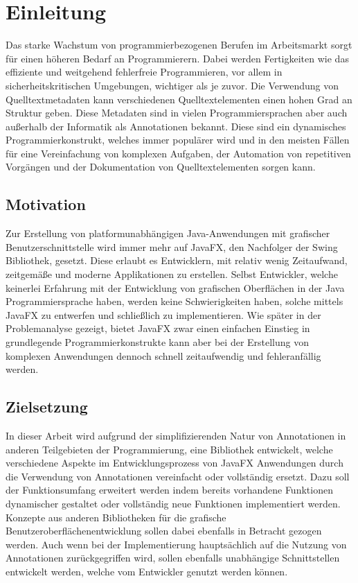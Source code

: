 \chapter{Einleitung}
\label{einleitung}
Das starke Wachstum von programmierbezogenen Berufen im Arbeitsmarkt sorgt für einen höheren Bedarf an Programmierern. Dabei werden Fertigkeiten wie das effiziente und weitgehend fehlerfreie Programmieren, vor allem in sicherheitskritischen Umgebungen, wichtiger als je zuvor. Die Verwendung von Quelltextmetadaten kann verschiedenen Quelltextelementen einen hohen Grad an Struktur geben. Diese Metadaten sind in vielen Programmiersprachen aber auch außerhalb der Informatik als Annotationen bekannt. Diese sind ein dynamisches Programmierkonstrukt, welches immer populärer wird und in den meisten Fällen für eine Vereinfachung von komplexen Aufgaben, der Automation von repetitiven Vorgängen und der Dokumentation von Quelltextelementen sorgen kann.
\section{Motivation}
\label{motivation}
Zur Erstellung von platformunabhängigen Java-Anwendungen mit grafischer Benutzerschnittstelle wird immer mehr auf JavaFX, den Nachfolger der Swing Bibliothek, gesetzt. Diese erlaubt es Entwicklern, mit relativ wenig Zeitaufwand, zeitgemäße und moderne Applikationen zu erstellen. Selbst Entwickler, welche keinerlei Erfahrung mit der Entwicklung von grafischen Oberflächen in der Java Programmiersprache haben, werden keine Schwierigkeiten haben, solche mittels JavaFX zu entwerfen und schließlich zu implementieren. Wie später in der Problemanalyse gezeigt, bietet JavaFX zwar einen einfachen Einstieg in grundlegende Programmierkonstrukte kann aber bei der Erstellung von komplexen Anwendungen dennoch schnell zeitaufwendig und fehleranfällig werden.
\section{Zielsetzung}
\label{zielsetzung}
In dieser Arbeit wird aufgrund der simplifizierenden Natur von Annotationen in anderen Teilgebieten der Programmierung, eine Bibliothek entwickelt, welche verschiedene Aspekte im Entwicklungsprozess von JavaFX Anwendungen durch die Verwendung von Annotationen vereinfacht oder vollständig ersetzt. Dazu soll der Funktionsumfang erweitert werden indem bereits vorhandene Funktionen dynamischer gestaltet oder vollständig neue Funktionen implementiert werden. Konzepte aus anderen Bibliotheken für die grafische Benutzeroberflächenentwicklung sollen dabei ebenfalls in Betracht gezogen werden. Auch wenn bei der Implementierung hauptsächlich auf die Nutzung von Annotationen zurückgegriffen wird, sollen ebenfalls unabhängige Schnittstellen entwickelt werden, welche vom Entwickler genutzt werden können.
